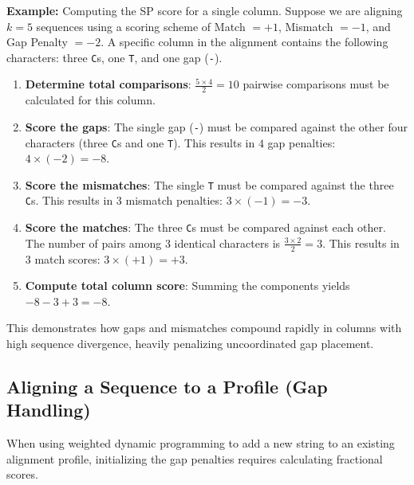 \textbf{Example:}
Computing the SP score for a single column.
Suppose we are aligning $k=5$ sequences using a scoring scheme of Match $= +1$, Mismatch $= -1$, and Gap Penalty $= -2$. A specific column in the alignment contains the following characters: three \texttt{C}s, one \texttt{T}, and one gap (\texttt{-}).
\begin{enumerate}
  \item \textbf{Determine total comparisons}: $\frac{5 \times 4}{2} = 10$ pairwise comparisons must be calculated for this column.
  \item \textbf{Score the gaps}: The single gap (\texttt{-}) must be compared against the other four characters (three \texttt{C}s and one \texttt{T}). This results in $4$ gap penalties: $4 \times (-2) = -8$.
  \item \textbf{Score the mismatches}: The single \texttt{T} must be compared against the three \texttt{C}s. This results in $3$ mismatch penalties: $3 \times (-1) = -3$.
  \item \textbf{Score the matches}: The three \texttt{C}s must be compared against each other. The number of pairs among $3$ identical characters is $\frac{3 \times 2}{2} = 3$. This results in $3$ match scores: $3 \times (+1) = +3$.
  \item \textbf{Compute total column score}: Summing the components yields $-8 - 3 + 3 = -8$.
\end{enumerate}
This demonstrates how gaps and mismatches compound rapidly in columns with high sequence divergence, heavily penalizing uncoordinated gap placement.

\subsection{Aligning a Sequence to a Profile (Gap Handling)}
When using weighted dynamic programming to add a new string to an existing alignment profile, initializing the gap penalties requires calculating fractional scores. 


